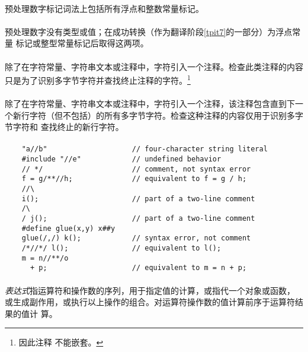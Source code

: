 {\paragraph{}
预处理数字标记词法上包括所有浮点和整数常量标记。

\semantic
\paragraph{}
预处理数字没有类型或值；在成功转换（作为翻译阶段\ref{tpit7}的一部分）为浮点常量
标记或整型常量标记后取得这两项。

\paragraph{}
除了在字符常量、字符串文本或注释中，字符\tm{/*}引入一个注释。检查此类注释的内容
只是为了识别多字节字符并查找终止注释的字符\tm{*/}。\footnote{因此注释
不能嵌套。}

\paragraph{}
除了在字符常量、字符串文本或注释中，字符\tm{//}引入一个注释，该注释包含直到下一
个新行字符（但不包括）的所有多字节字符。检查这种注释的内容仅用于识别多字节字符和
查找终止的新行字符。

\paragraph{}
\ex*
\begin{lstlisting}
    "a//b"                    // four-character string literal
    #include "//e"            // undefined behavior
    // */                     // comment, not syntax error
    f = g/**//h;              // equivalent to f = g / h;
    //\
    i();                      // part of a two-line comment
    /\
    / j();                    // part of a two-line comment
    #define glue(x,y) x##y
    glue(/,/) k();            // syntax error, not comment
    /*//*/ l();               // equivalent to l();
    m = n//**/o
      + p;                    // equivalent to m = n + p;
\end{lstlisting}

\paragraph{}
\textit{表达式}指运算符和操作数的序列，用于指定值的计算，或指代一个对象或函数，
或生成副作用，或执行以上操作的组合。对运算符操作数的值计算前序于运算符结果的值计
算。

}
